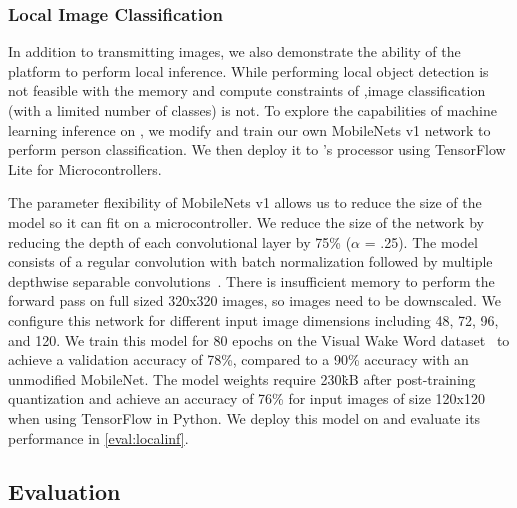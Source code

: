 \subsubsection{Local Image Classification}
In addition to transmitting images, we also demonstrate the ability of the platform to perform local inference.
While performing local object detection is not feasible with the memory and compute constraints of \namec,image classification (with a limited number of classes) is not. 
To explore the capabilities of machine learning inference on \namec,
we modify and train our own MobileNets v1 network to perform person classification. We then deploy it to \namec's processor using TensorFlow Lite for Microcontrollers. 

The parameter flexibility of MobileNets v1 allows us to reduce the size of the model so it can fit on a microcontroller. We reduce the size of the network by reducing the depth of each convolutional layer by 75\% ($\alpha$ = .25).  
The model consists of a regular convolution with batch normalization followed by multiple depthwise separable convolutions~\cite{howard2017mobilenets}. 
There is insufficient memory to perform the forward pass on full sized 320x320 images, so images need to be downscaled. We configure this network for different input image dimensions including 48, 72, 96, and 120.
We train this model for 80 epochs on the Visual Wake Word dataset~\cite{chowdhery2019visual} to achieve a validation accuracy of 78\%, compared to a 90\% accuracy with an unmodified MobileNet. The model weights require 230\.kB after post-training quantization and achieve an accuracy of 76\% for input images of size 120x120 when using TensorFlow in Python. We deploy this model on \namec and evaluate its performance in \cref{eval:localinf}.

\subsection{\namec Evaluation}

